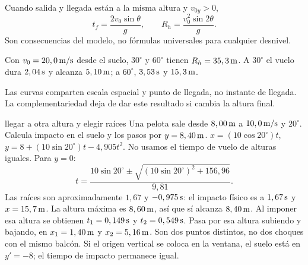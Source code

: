 \documentclass[11pt,a4paper]{article}
\begin{document}
Cuando salida y llegada est\'an a la misma altura y $v_{0y}>0$,
\[
t_f=\frac{2v_0\sin\theta}g,\qquad
R_h=\frac{v_0^2\sin2\theta}g.
\]
Son consecuencias del modelo, no f\'ormulas universales para cualquier desnivel.

Con $v_0=20,0\,\mathrm{m/s}$ desde el suelo, $30^\circ$ y $60^\circ$ tienen
$R_h=35,3\,\mathrm{m}$. A $30^\circ$ el vuelo dura $2,04\,\mathrm{s}$ y alcanza
$5,10\,\mathrm{m}$; a $60^\circ$, $3,53\,\mathrm{s}$ y $15,3\,\mathrm{m}$.
\begin{center}
\end{center}
Las curvas comparten escala espacial y punto de llegada, no instante de llegada.
La complementariedad deja de dar este resultado si cambia la altura final.

\begin{examplebox}{llegar a otra altura y elegir ra\'ices}
 Una pelota sale desde $8,00\,\mathrm{m}$ a $10,0\,\mathrm{m/s}$
y $20^\circ$. Calcula impacto en el suelo y los pasos por $y=8,40\,\mathrm{m}$.
\solutionblock
{} $x=(10\cos20^\circ)t$, $y=8+(10\sin20^\circ)t-4,905t^2$.
No usamos el tiempo de vuelo de alturas iguales.
 Para $y=0$:
\[
t=\frac{10\sin20^\circ\pm\sqrt{(10\sin20^\circ)^2+156,96}}{9,81}.
\]
Las ra\'ices son aproximadamente $1,67$ y $-0,975\,\mathrm{s}$:
el impacto f\'isico es a $1,67\,\mathrm{s}$ y $x=15,7\,\mathrm{m}$.
La altura m\'axima es $8,60\,\mathrm{m}$, as\'i que s\'i alcanza $8,40\,\mathrm{m}$.
Al imponer esa altura se obtienen
$t_1=0,149\,\mathrm{s}$ y $t_2=0,549\,\mathrm{s}$.
 Pasa por esa altura subiendo y bajando,
en $x_1=1,40\,\mathrm{m}$ y $x_2=5,16\,\mathrm{m}$.
Son dos puntos distintos, no dos choques con el mismo balc\'on.
Si el origen vertical se coloca en la ventana, el suelo est\'a en $y'=-8$;
el tiempo de impacto permanece igual.
\end{examplebox}
\end{document}
